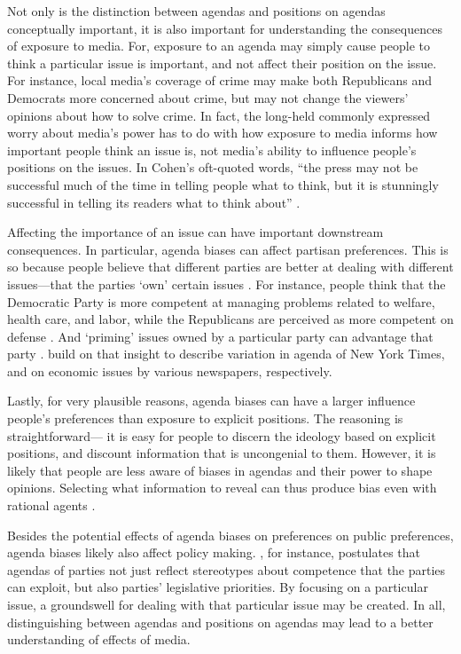 \documentclass[12pt, letterpaper]{article}
\begin{document}
Not only is the distinction between agendas and positions on agendas conceptually important, it is also important for understanding the consequences of exposure to media. For, exposure to an agenda may simply cause people to think a particular issue is important, and not affect their position on the issue. For instance, local media's coverage of crime may make both Republicans and Democrats more concerned about crime, but may not change the viewers' opinions about how to solve crime. In fact, the long-held commonly expressed worry about media's power has to do with how exposure to media informs how important people think an issue is, not media's ability to influence people's positions on the issues. In Cohen's oft-quoted words, ``the press may not be successful much of the time in telling people what to think, but it is stunningly successful in telling its readers what to think about'' \citep{cohen1963press}.

Affecting the importance of an issue can have important downstream consequences. In particular, agenda biases can affect partisan preferences. This is so because people believe that different parties are better at dealing with different issues---that the parties `own' certain issues \citep{petrocik1996issue}. For instance, people think that the Democratic Party is more competent at managing problems related to welfare, health care, and labor, while the Republicans are perceived as more competent on defense \citep{petrocik1996issue, goggin2015}. And `priming' issues owned by a particular party can advantage that party \citep{petrocik1996issue, petrocik2003issue}. \citet{puglisi2011being, larcinese2011partisan} build on that insight to describe variation in agenda of New York Times, and on economic issues by various newspapers, respectively. 

Lastly, for very plausible reasons, agenda biases can have a larger influence people's preferences than exposure to explicit positions. The reasoning is straightforward--- it is easy for people to discern the ideology based on explicit positions, and discount information that is uncongenial to them. However, it is likely that people are less aware of biases in agendas and their power to shape opinions. Selecting what information to reveal can thus produce bias even with rational agents \citep[for relevant formal theoretic accounts, see][]{anderson2012media, bernhardt2008political}.

Besides the potential effects of agenda biases on preferences on public preferences, agenda biases likely also affect policy making. \citet{egan2013partisan}, for instance, postulates that agendas of parties not just reflect stereotypes about competence that the parties can exploit, but also parties' legislative priorities. By focusing on a particular issue, a groundswell for dealing with that particular issue may be created. In all, distinguishing between agendas and positions on agendas may lead to a better understanding of effects of media.
\end{document}
